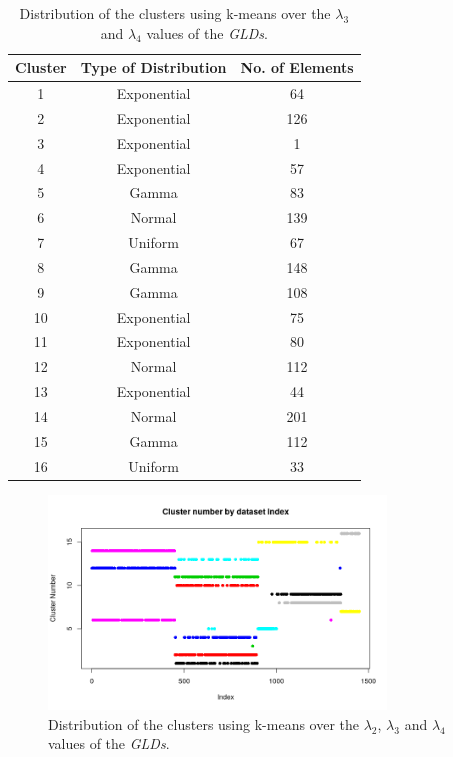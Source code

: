  \begin{table}[]
\centering
\caption{Distribution of the clusters using k-means over the $\lambda_{3}$ and $\lambda_{4}$ values of the \textit{GLDs}.}
\label{tab:dataset2_l3l4}
\begin{tabular}{|c|c|c|}
\hline
Cluster & Type of Distribution & No. of Elements \\ \hline
1       & Exponential          & 64              \\ \hline
2       & Exponential          & 126              \\ \hline
3       & Exponential          & 1             \\ \hline
4       & Exponential               & 57              \\ \hline
5       & Gamma               & 83             \\ \hline
6       & Normal               & 139            \\ \hline
7       & Uniform              & 67            \\ \hline
8       & Gamma          & 148              \\ \hline
9       & Gamma          & 108               \\ \hline
10      & Exponential               & 75              \\ \hline
11      & Exponential          & 80              \\ \hline
12       & Normal              & 112             \\ \hline
13       & Exponential          & 44              \\ \hline
14       & Normal          & 201              \\ \hline
15      & Gamma               & 112              \\ \hline
16      & Uniform          & 33              \\ \hline
\end{tabular}
\end{table}
 
 \begin{figure}[H]
    \centering
    \includegraphics[width=0.8\textwidth]{img/gld_clustering/Dataset2/nuevo/l3_l4/clusters_by_index.png}
    \caption{Distribution of the clusters using k-means over the $\lambda_{2}$, $\lambda_{3}$ and $\lambda_{4}$ values of the \textit{GLDs}.}
    \label{fig:dataset2_l2l3l4}
\end{figure}


